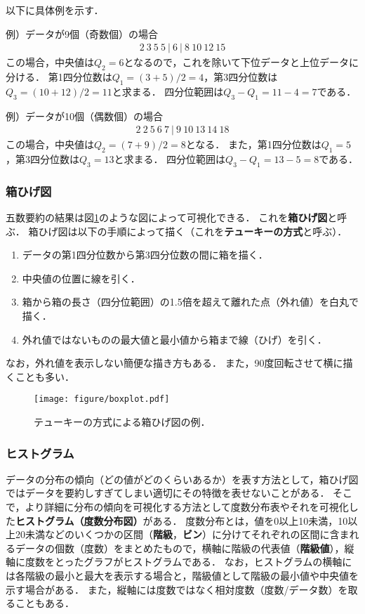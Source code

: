 %
以下に具体例を示す．

\vspace{0.5cm}
\noindent 例）データが9個（奇数個）の場合
%
\begin{align*}
	2\ 3\ 5\ 5\ |\ 6\ |\ 8\ 10\ 12\ 15
\end{align*}
%
この場合，中央値は$ Q_{2}=6 $となるので，これを除いて下位データと上位データに分ける．
%
第1四分位数は$ Q_{1}=(3+5)/2=4 $，第3四分位数は$ Q_{3}=(10+12)/2=11 $と求まる．
%
四分位範囲は$ Q_{3}-Q_{1}=11-4=7 $である．
%

\vspace{0.5cm}
\noindent 例）データが10個（偶数個）の場合
%
\begin{align*}
	2\ 2\ 5\ 6\ 7\ |\ 9\ 10\ 13\ 14\ 18
\end{align*}
%
この場合，中央値は$ Q_{2}=(7+9)/2=8 $となる．
%
また，第1四分位数は$ Q_{1}=5 $，第3四分位数は$ Q_{3}=13 $と求まる．
%
四分位範囲は$ Q_{3}-Q_{1}=13-5=8 $である．


\subsubsection*{箱ひげ図}
%
五数要約の結果は図\ref{fig:boxplot}のような図によって可視化できる．
%
これを\textbf{箱ひげ図}と呼ぶ．
%
箱ひげ図は以下の手順によって描く（これを\textbf{テューキーの方式}と呼ぶ）．
%
\begin{enumerate}
\item
データの第1四分位数から第3四分位数の間に箱を描く．
\item
中央値の位置に線を引く．
\item
箱から箱の長さ（四分位範囲）の1.5倍を超えて離れた点（外れ値）を白丸で描く．
\item
外れ値ではないものの最大値と最小値から箱まで線（ひげ）を引く．
\end{enumerate}
%
なお，外れ値を表示しない簡便な描き方もある．
%
また，90度回転させて横に描くことも多い．
%

%
\begin{figure}[H]
	\centering
	\texttt{[image: figure/boxplot.pdf]}
	\caption{テューキーの方式による箱ひげ図の例．}
	\label{fig:boxplot}
\end{figure}
%

\subsubsection*{ヒストグラム}
%
データの分布の傾向（どの値がどのくらいあるか）を表す方法として，箱ひげ図ではデータを要約しすぎてしまい適切にその特徴を表せないことがある．
%
そこで，より詳細に分布の傾向を可視化する方法として度数分布表やそれを可視化した\textbf{ヒストグラム（度数分布図）}がある．
%
度数分布とは，値を0以上10未満，10以上20未満などのいくつかの区間（\textbf{階級}，\textbf{ビン}）に分けてそれぞれの区間に含まれるデータの個数（度数）をまとめたもので，横軸に階級の代表値（\textbf{階級値}），縦軸に度数をとったグラフがヒストグラムである．
%
なお，ヒストグラムの横軸には各階級の最小と最大を表示する場合と，階級値として階級の最小値や中央値を示す場合がある．
%
また，縦軸には度数ではなく相対度数（度数/データ数）を取ることもある．
%

